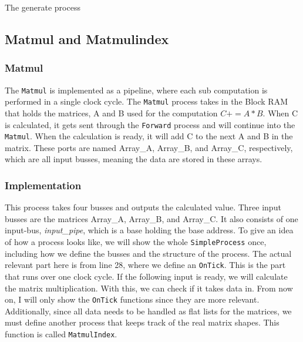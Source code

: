 \begin{listing}
  \inputminted{csharp}{codesnippets/generate.cs}
  \caption{The generate process}
  \label{lst:datagenerator}
\end{listing}

\subsection{Matmul and Matmulindex}

\subsubsection{Matmul}
The \texttt{Matmul} is implemented as a pipeline, where each sub computation is performed in a single clock cycle.
The \texttt{Matmul} process takes in the Block RAM that holds the matrices, A and B used for the computation $C += A * B$. When C is calculated, it gets sent through the \texttt{Forward} process and will continue into the \texttt{Matmul}. When the calculation is ready, it will add C to the next A and B in the matrix. These ports are named Array\_A, Array\_B, and Array\_C, respectively, which are all input busses, meaning the data are stored in these arrays.

\subsubsection{Implementation}
This process takes four busses and outputs the calculated value.
Three input busses are the matrices Array\_A, Array\_B, and Array\_C.
It also consists of one input-bus, \emph{input\_pipe}, which is a base holding the base address. 
To give an idea of how a process looks like, we will show the whole \texttt{SimpleProcess} once, including how we define the busses and the structure of the process. The actual relevant part here is from line 28, where we define an \texttt{OnTick}. This is the part that runs over one clock cycle. If the following input is ready, we will calculate the matrix multiplication. With this, we can check if it takes data in. From now on, I will only show the \texttt{OnTick} functions since they are more relevant.
Additionally, since all data needs to be handled as flat lists for the matrices, we must define another process that keeps track of the real matrix shapes. This function is called \texttt{MatmulIndex}. 


